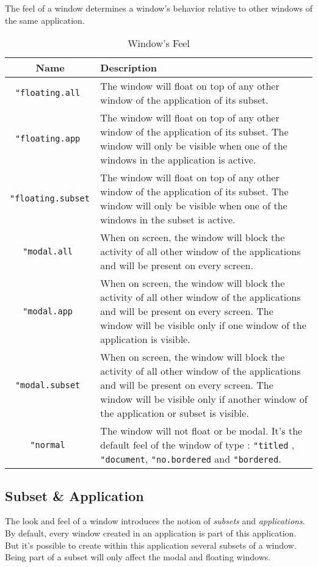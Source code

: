 The feel of a window determines a window's behavior relative to other windows of the same application.

\newpage

\begin{table}[h!]
\centering
\begin{tabular}{|c|p{6cm}|}
\hline
\bf Name & \bf Description \\
\hline
\tt "floating.all & The window will float on top of any other window of the application of its subset. \\
\hline
\tt "floating.app & The window will float on top of any other window of the application of its subset. The window will only be visible when one of the windows in the application is active. \\
\hline
\tt "floating.subset & The window will float on top of any other window of the application of its subset. The window will only be visible when one of the windows in the subset is active. \\
\hline
\tt "modal.all & When on screen, the window will block the activity of all other window of the applications and will be present on every screen. \\
\hline
\tt "modal.app & When on screen, the window will block the activity of all other window of the applications and will be present on every screen. The window will be visible only if one window of the application is visible. \\
\hline
\tt "modal.subset & When on screen, the window will block the activity of all other window of the applications and will be present on every screen. The window will be visible only if another window of the application or subset is visible. \\
\hline
\tt "normal & The window will not float or be modal. It's the default feel of the window of type : {\tt "titled} , {\tt "document}, {\tt "no.bordered} and {\tt "bordered}. \\
\hline
\end{tabular}
\caption{Window's Feel}
\end{table}

\subsection{Subset \& Application}

The look and feel of a window introduces the notion of {\em subsets} and {\em applications}. By default, every window created in an application is part of this application. But it's possible to create within this application several subsets of a window. Being part of a subset will only affect the modal and floating windows.

